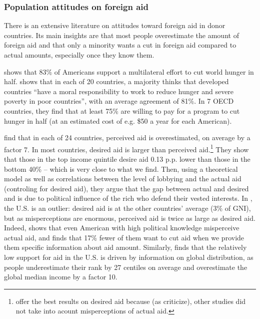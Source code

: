 \subsubsection{Population attitudes on foreign aid}\label{subsubsec:literature_foreign_aid}

There is an extensive literature on attitudes toward foreign aid in donor countries. Its main insights are that most people overestimate the amount of foreign aid and that only a minority wants a cut in foreign aid compared to actual amounts, especially once they know them. 

\citet{pipa_americans_2001} shows that 83\% of Americans support a multilateral effort to cut world hunger in half. 
\citet{pipa_publics_2008} shows that in each of 20 countries, a majority thinks that developed countries ``have a moral responsibility to work to reduce hunger and severe poverty in poor countries'', with an average agreement of 81\%. In 7 OECD countries, they find that at least 75\% are willing to pay for a program to cut hunger in half (at an estimated cost of e.g. \$50 a year for each American). 

\citet{kaufmann_foreign_2012} find that in each of 24 countries, perceived aid is overestimated, on average by a factor 7. In most countries, desired aid is larger than perceived aid.\footnote{\citet{kaufmann_foreign_2012} offer the best results on desired aid because (as \citet{hudson_mile_2012} criticize), other studies did not take into acount misperceptions of actual aid.} They show that those in the top income quintile desire aid 0.13 p.p. lower than those in the bottom 40\% -- which is very close to what we find. %
Then, using a theoretical model as well as correlations between the level of lobbying and the actual aid (controling for desired aid), they argue that the gap between actual and desired and is due to political influence of the rich who defend their vested interests. 
In \citet{kaufmann_foreign_2012}, the U.S. is an outlier: desired aid is at the other countries' average (3\% of GNI), but as misperceptions are enormous, perceived aid is twice as large as desired aid. Indeed, \citet{gilens_political_2001} shows that even American with high political knowledge misperceive actual aid, and finds that 17\% fewer of them want to cut aid when we provide them specific information about aid amount. %
Similarly, \citet{nair_misperceptions_2018} finds that the relatively low support for aid in the U.S. is driven by information on global distribution, as people underestimate their rank by 27 centiles on average and overestimate the global median income by a factor 10. 

